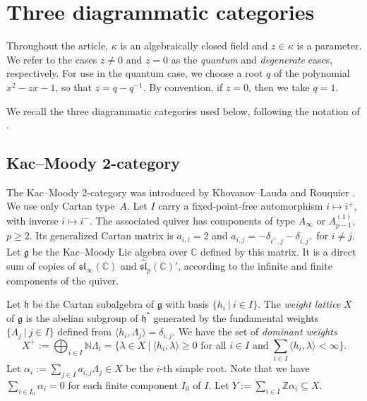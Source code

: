 \documentclass[12pt]{amsart}
\numberwithin{itemcounter}{subsection}
\theoremstyle{plain}
\theoremstyle{definition}
\theoremstyle{remark}
\numberwithin{equation}{section}
\def\kk{\kappa}
\def\C{\operatorname{C}\nolimits}
\def\Z{\operatorname{Z}\nolimits}
\renewcommand{\sl}{\mathfrak{sl}}
\newcommand{\g}{\mathfrak{g}}
\newcommand{\hh}{\mathfrak{h}}
\def\C{{\mathbb C}}
\def\Z{{\mathbb Z}}
\def\N{{\mathbb N}}
\newcommand{\qc}{p}
\begin{document}
\section{Three diagrammatic categories}\label{threecats}

Throughout the article, $\kk$ is an algebraically closed field and $z \in \kk$ is a parameter.
We refer to the cases $z\neq 0$ and $z = 0$ as the
{\em quantum} and {\em degenerate} cases, respectively.
For use in the quantum case, we choose a root $q$ of the polynomial
$x^2-zx-1$, so that $z=q - q^{-1}$. By convention, if $z=0$, then we take $q=1$.

We recall the three diagrammatic categories used below, following the
notation of \cite[\S3]{BSW20a}.
\subsection{Kac--Moody 2-category}
\label{sec:KMCdef}
The Kac--Moody 2-category was introduced by Khovanov--Lauda \cite{KL10}
and Rouquier \cite{R08}.  We use only Cartan type~$A$.  Let $I$ carry a
fixed-point-free automorphism $i\mapsto i^+$, with inverse $i\mapsto i^-$.
The associated quiver has components of type $A_\infty$ or
$A_{\qc-1}^{(1)}$, $\qc\geq2$.  Its generalized Cartan matrix is
$a_{i,i}=2$ and
$a_{i,j}=-\delta_{i^+,j}-\delta_{i,j^+}$ for $i\ne j$.  Let $\g$ be the
Kac--Moody Lie algebra over $\C$ defined by this matrix.  It is a direct sum
of copies of $\sl_\infty(\C)$ and $\widehat{\sl}_{\qc}(\C)'$, according to
the infinite and finite components of the quiver.

Let $\hh$ be the Cartan subalgebra of $\g$ with
basis
$\{h_i\:|\:i \in I\}$.
The {\em weight lattice} $X$ of $\g$ is the abelian
subgroup of $\hh^*$ generated by
the fundamental weights $\{\Lambda_j\:|\:j \in I\}$ defined from
$\langle h_i,\Lambda_j \rangle = \delta_{i,j}$.
We have the set of {\em dominant weights}
$$
X^+ := \bigoplus_{i \in I} \N \Lambda_i
= \big\{\lambda \in X\:\big|\:\langle h_i, \lambda \rangle \geq 0
\text{ for all $i \in I$ and $\textstyle\sum_{i \in I}\langle
  h_i,\lambda\rangle < \infty$}\big\}.
$$
Let $\alpha_i := \sum_{j \in I} a_{i,j} \Lambda_j \in X$ be the
$i$-th simple root.
Note that
we have  $\sum_{i \in I_0} \alpha_i = 0$ for each finite component
$I_0$ of $I$.
Let $Y := \sum_{i \in I} \Z \alpha_i \subseteq X$.
\end{document}
